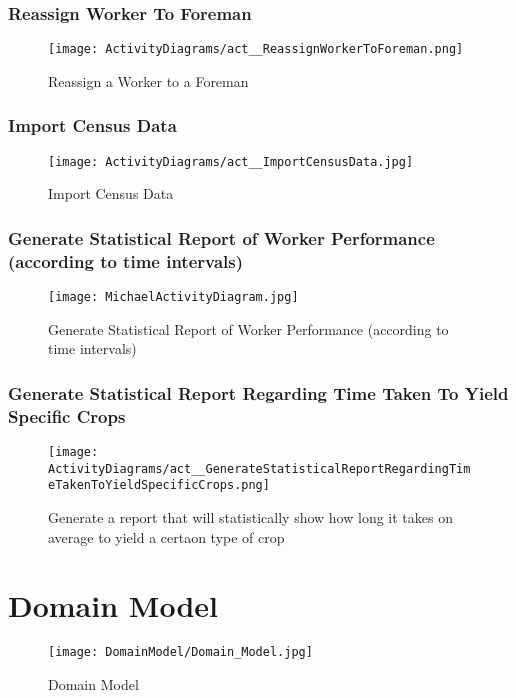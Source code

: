 \documentclass[11pt,fleqn]{book} %
\begin{document}
\subsection{Reassign Worker To Foreman}
\begin{figure}
	\texttt{[image: ActivityDiagrams/act\_\_ReassignWorkerToForeman.png]}
	\caption{Reassign a Worker to a Foreman}
\end{figure}

\subsection{Import Census Data}
\begin{figure}
	\texttt{[image: ActivityDiagrams/act\_\_ImportCensusData.jpg]}
	\caption{Import Census Data}
\end{figure}

\subsection{Generate Statistical Report of Worker Performance (according to time intervals)}
\begin{figure}
	\texttt{[image: MichaelActivityDiagram.jpg]}
	\caption{Generate Statistical Report of Worker Performance (according to time intervals)}
\end{figure}

\subsection{Generate Statistical Report Regarding Time Taken To Yield Specific Crops}
\begin{figure}
	\texttt{[image: ActivityDiagrams/act\_\_GenerateStatisticalReportRegardingTimeTakenToYieldSpecificCrops.png]}
	\caption{Generate a report that will statistically show how long it takes on average to yield a certaon type of crop}
\end{figure}
\newpage


\chapter{Domain Model}
\begin{figure}
	\texttt{[image: DomainModel/Domain\_Model.jpg]}
	\caption{Domain Model}
\end{figure}	
	
\end{document}
